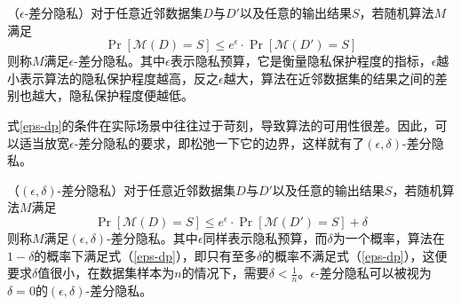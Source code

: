 \begin{definition}
	（$\epsilon$-差分隐私\cite{dwork2006our}）对于任意近邻数据集$D$与$D'$以及任意的输出结果$S$，若随机算法$M$满足
	\begin{equation}
		\label{eps-dp}
		\mathop{Pr}[\mathcal{M}(D) = S] \leq e^{\epsilon} \cdot \mathop{Pr}[\mathcal{M}(D') = S]
	\end{equation}
	则称$M$满足$\epsilon$-差分隐私。其中$\epsilon$表示隐私预算，它是衡量隐私保护程度的指标，$\epsilon$越小表示算法的隐私保护程度越高，反之$\epsilon$越大，算法在近邻数据集的结果之间的差别也越大，隐私保护程度便越低。
\end{definition}

式\ref{eps-dp}的条件在实际场景中往往过于苛刻，导致算法的可用性很差。因此，可以适当放宽$\epsilon$-差分隐私的要求，即松弛一下它的边界，这样就有了$(\epsilon, \delta)$-差分隐私。

\begin{definition}
	（$(\epsilon, \delta)$-差分隐私\cite{Algorithmic_Foundations_of_DP}）对于任意近邻数据集$D$与$D'$以及任意的输出结果$S$，若随机算法$M$满足
	\begin{equation}
		\label{eps-delta-dp}
		\mathop{Pr}[\mathcal{M}(D) = S] \leq e^{\epsilon} \cdot \mathop{Pr}[\mathcal{M}(D') = S] + \delta
	\end{equation}
	则称$M$满足$(\epsilon, \delta)$-差分隐私。其中$\epsilon$同样表示隐私预算，而$\delta$为一个概率，算法在$1-\delta$的概率下满足式（\ref{eps-dp}），即只有至多$\delta$的概率不满足式（\ref{eps-dp}），这便要求$\delta$值很小，在数据集样本为$n$的情况下\cite{Mechanism_DP}，需要$\delta<\frac{1}{n}$。$\epsilon$-差分隐私可以被视为$\delta=0$的$(\epsilon, \delta)$-差分隐私。
\end{definition}


